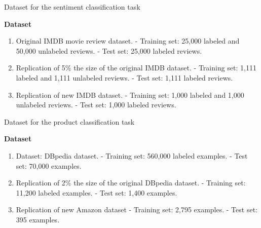 \documentclass[aspectratio=169,xcolor=dvipsnames]{beamer}
\begin{document}


\begin{frame}{Dataset for the sentiment classification task}
    \tableofcontents

    \textbf{Dataset}
    \begin{enumerate}
        \item Original IMDB  movie review dataset.\break 
            - Training set: 25,000 labeled and 50,000 unlabeled reviews.\break 
            - Test set: 25,000 labeled reviews.\break
            
         \item  Replication of 5\% the size of the original IMDB dataset.\break 
            - Training set: 1,111 labeled and 1,111 unlabeled reviews.\break 
            - Test set: 1,111 labeled reviews.\break
            
        \item Replication of new IMDB dataset.\break 
            - Training set: 1,000 labeled and 1,000 unlabeled reviews.\break 
            - Test set: 1,000 labeled reviews.\break
        \end{enumerate}
\end{frame}

\begin{frame}{Dataset for the product classification task}
    \tableofcontents

    \textbf{Dataset}
        \begin{enumerate}
        \item Dataset: DBpedia dataset.\break 
            - Training set: 560,000 labeled examples.\break
            - Test set: 70,000 examples.\break
         
         \item Replication of 2\% the size of the original DBpedia dataset.\break 
            - Training set: 11,200 labeled examples.\break 
            - Test set: 1,400 examples.\break
        
        \item Replication of new Amazon dataset\break 
            - Training set: 2,795 examples.\break 
            - Test set: 395 examples.\break
        \end{enumerate}
\end{frame}
\end{document}

